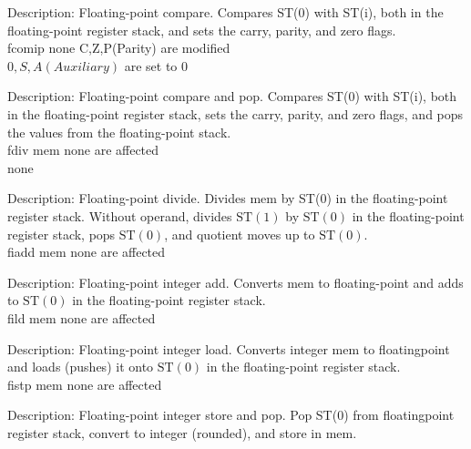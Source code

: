 \documentclass[10pt]{book}
\begin{document}
\begin{center}
\begin{center}
\begin{center}
\begin{center}
\begin{center}
Description: Floating-point compare. Compares ST(0) with ST(i), both in the floating-point register stack, and sets the carry, parity, and zero flags.\\
fcomip none C,Z,P(Parity) are modified\\
$0, S, A(A u x i l i a r y)$ are set to 0

Description: Floating-point compare and pop. Compares ST(0) with ST(i), both in the floating-point register stack, sets the carry, parity, and zero flags, and pops the values from the floating-point stack.\\
fdiv mem none are affected\\
none

Description: Floating-point divide. Divides mem by ST(0) in the floating-point register stack. Without operand, divides $\mathrm{ST}(1)$ by $\mathrm{ST}(0)$ in the floating-point register stack, pops $\mathrm{ST}(0)$, and quotient moves up to $\mathrm{ST}(0)$.\\
fiadd mem none are affected

Description: Floating-point integer add. Converts mem to floating-point and adds to $\mathrm{ST}(0)$ in the floating-point register stack.\\
fild mem none are affected

Description: Floating-point integer load. Converts integer mem to floatingpoint and loads (pushes) it onto $\mathrm{ST}(0)$ in the floating-point register stack.\\
fistp mem none are affected

Description: Floating-point integer store and pop. Pop ST(0) from floatingpoint register stack, convert to integer (rounded), and store in mem.


\end{center}
\end{center}
\end{center}
\end{center}
\end{center}
\end{document}
